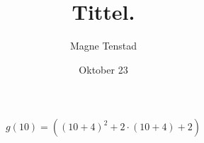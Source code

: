 \title{Tittel.}
\author{Magne Tenstad}
\date{Oktober 23}

	\begin{align}
		g\left(10\right) = (\left(10+4\right)^2 + 2\cdot\left(10+4\right) + 2)\\
	\end{align}

